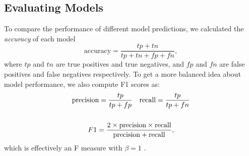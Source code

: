 \subsection{Evaluating Models} \label{evalmodels}
To compare the performance of different model predictions, we calculated the \textit{accuracy} of each model
\begin{equation}
    \text{accuracy} = \frac{tp+tn}{tp+tn+fp+fn},
\end{equation}
where $tp$ and $tn$ are true positives and true negatives, and $fp$ and $fn$ are false positives and false negatives respectively.  %
To get a more balanced idea about model performance, we also compute F1 scores as:
\begin{gather}
    \text{precision} = \frac{tp}{tp+fp} \quad
 \text{recall} = \frac{tp}{tp+fn}\\
 \vspace{0.0cm} \notag \\
F1 = \frac{2\times\text{precision} \times \text{recall}}{\text{precision} + \text{recall}},
\end{gather}
which is effectively an F measure with $\beta=1$ \cite{sokolova2006beyond}.

